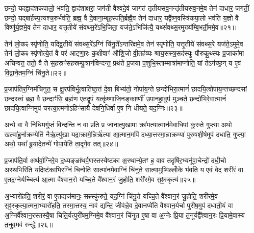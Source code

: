 छन्दो॒ यद्द्वाद॑शकपालो॒ भव॑ति॒ द्वाद॑शाक्षरा॒ जग॑ती वैश्वदे॒वं जाग॑तं तृतीयसव॒नन्तृ॑तीयसव॒नमे॒व तेन॑ दाधार॒ जग॑तीं॒ छन्दो॒ यद्बा॑र्\mbox{}हस्प॒त्यश्च॒रुर्भव॑ति॒ ब्रह्म॒ वै दे॒वाना॒म्बृह॒स्पति॒र्ब्रह्मै॒व तेन॑ दाधार॒ यद्वै᳚ष्ण॒वस्त्रि॑कपा॒लो भव॑ति य॒ज्ञो वै विष्णु॑र्य॒ज्ञमे॒व तेन॑ दाधार॒ यत्तृ॒तीये॑ संवथ्स॒रे॑\-ऽभि॒जिता॒ यज॑ते॒\-ऽभिजि॑त्यै॒ यथ्सं॑वथ्स॒रमुख्य॑म्बि॒भर्ती॒ममे॒व॥२१॥

तेन॑ लो॒कꣴ स्पृ॑णोति॒ यद्द्वि॒तीये॑ संवथ्स॒रे᳚\-ऽग्निं चि॑नु॒ते᳚\-ऽन्तरि॑क्षमे॒व तेन॑ स्पृणोति॒ यत्तृ॒तीये॑ संवथ्स॒रे यज॑ते॒\-ऽमुमे॒व तेन॑ लो॒कꣴ स्पृ॑णोत्ये॒तं वै पर॑ आट्णा॒रः क॒क्षीवाꣳ॑ औशि॒जो वी॒तह॑व्यः श्राय॒सस्त्र॒सद॑स्युः पौरुकु॒थ्स्यः प्र॒जाका॑मा अचिन्वत॒ ततो॒ वै ते स॒हस्रꣳ॑सहस्रम्पु॒त्रान॑विन्दन्त॒ प्रथ॑ते प्र॒जया॑ प॒शुभि॒स्ताम्मात्रा॑माप्नोति॒ यां ते\-ऽग॑च्छ॒न् य ए॒वं वि॒द्वाने॒तम॒ग्निं चि॑नु॒ते॥२२॥

{\anuvakamend[{दा॒धा॒र॒ त्रि॒ष्टुभ॑मि॒ममे॒वैवं च॒त्वारि॑ च॥५॥}]}

प्र॒जाप॑तिर॒ग्निम॑चिनुत॒ स क्षु॒रप॑विर्भू॒त्वाति॑ष्ठ॒त्तं दे॒वा बिभ्य॑तो॒ नोपा॑य॒न्ते छन्दो॑भिरा॒त्मानं॑ छादयि॒त्वोपा॑य॒न्तच्छन्द॑सां छन्द॒स्त्वं ब्रह्म॒ वै छन्दाꣳ॑सि॒ ब्रह्म॑ण ए॒तद्रू॒पं यत्कृ॑ष्णाजि॒नङ्कार्ष्णी॑ उपा॒नहा॒वुप॑ मुञ्चते॒ छन्दो॑भिरे॒वात्मानं॑ छादयि॒त्वाग्निमुप॑ चरत्या॒त्मनो\-ऽहिꣳ॑सायै देवनि॒धिर्वा ए॒ष नि धी॑यते॒ यद॒ग्निः॥२३॥

अ॒न्ये वा॒ वै नि॒धिमगु॑प्तं वि॒न्दन्ति॒ न वा॒ प्रति॒ प्र जा॑नात्यु॒खामा क्रा॑मत्या॒त्मान॑मे॒वाधि॒पां कु॑रुते॒ गुप्त्या॒ अथो॒ खल्वा॑हु॒र्नाक्रम्येति॑ नैर्\mbox{}ऋ॒त्यु॑खा यदा॒क्रामे॒न्निर्\mbox{}ऋ॑त्या आ॒त्मान॒मपि॑ दध्या॒त्तस्मा॒न्नाक्रम्या॑ पुरुषशी॒र्\mbox{}षमुप॑ दधाति॒ गुप्त्या॒ अथो॒ यथा᳚ ब्रू॒यादे॒तन्मे॑ गोपा॒येति॑ ता॒दृगे॒व तत्॥२४॥

प्र॒जाप॑ति॒र्वा अथ॑र्वा॒ग्निरे॒व द॒ध्यङ्ङा॑थर्व॒णस्तस्येष्ट॑का अ॒स्थान्ये॒तꣳ ह॒ वाव तदृषि॑र॒भ्यनू॑वा॒चेन्द्रो॑ दधी॒चो अ॒स्थभि॒रिति॒ यदिष्ट॑काभिर॒ग्निं चि॒नोति॒ सात्मा॑नमे॒वाग्निं चि॑नुते॒ सात्मा॒मुष्मि॑ल्लोँ॒के भ॑वति॒ य ए॒वं वेद॒ शरी॑रं॒ वा ए॒तद॒ग्नेर्यच्चित्य॑ आ॒त्मा वै᳚श्वान॒रो यच्चि॒ते वै᳚श्वान॒रं जु॒होति॒ शरी॑रमे॒व स॒ꣴ॒स्कृत्य॑॥२५॥

अ॒भ्यारो॑हति॒ शरी॑रं॒ वा ए॒तद्यज॑मानः॒ सꣴस्कु॑रुते॒ यद॒ग्निं चि॑नु॒ते यच्चि॒ते वै᳚श्वान॒रं जु॒होति॒ शरी॑रमे॒व स॒ꣴ॒स्कृत्या॒त्मना॒भ्यारो॑हति॒ तस्मा॒त्तस्य॒ नाव॑ द्यन्ति॒ जीव॑न्ने॒व दे॒वानप्ये॑ति वैश्वान॒र्यर्चा पुरी॑ष॒मुप॑ दधाती॒यं वा अ॒ग्निर्वै᳚श्वान॒रस्तस्यै॒षा चिति॒र्यत्पुरी॑षम॒ग्निमे॒व वै᳚श्वान॒रं चि॑नुत ए॒षा वा अ॒ग्नेः प्रि॒या त॒नूर्यद्वै᳚श्वान॒रः प्रि॒यामे॒वास्य॑ त॒नुव॒मव॑ रुन्द्धे॥२६॥

